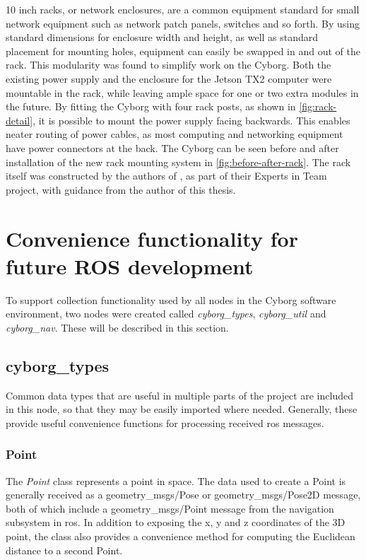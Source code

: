 \documentclass[\rootfolder/main.tex]{subfiles}
\begin{document}
10 inch racks, or network enclosures, are a common equipment standard for small network equipment such as network patch panels, switches and so forth.
By using standard dimensions for enclosure width and height, as well as standard placement for mounting holes, equipment can easily be swapped in and out of the rack.
This modularity was found to simplify work on the Cyborg. 
Both the existing power supply and the enclosure for the Jetson TX2 computer were mountable in the rack, while leaving ample space for one or two extra modules in the future.
By fitting the Cyborg with four rack posts, as shown in \cref{fig:rack-detail}, it is possible to mount the power supply facing backwards.
This enables neater routing of power cables, as most computing and networking equipment have power connectors at the back.
The Cyborg can be seen before and after installation of the new rack mounting system in \cref{fig:before-after-rack}.
The rack itself was constructed by the authors of \cite{Johansen2018}, as part of their Experts in Team project, with guidance from the author of this thesis.

\section{Convenience functionality for future ROS development}

To support collection functionality used by all nodes in the Cyborg software environment, two nodes were created called \emph{cyborg\_types}, \emph{cyborg\_util} and \emph{cyborg\_nav}.
These will be described in this section.

\subsection{cyborg\_types}

Common data types that are useful in multiple parts of the project are included in this node, so that they may be easily imported where needed.
Generally, these provide useful convenience functions for processing received \acrshort{ros} messages.

\subsubsection{Point}

The \emph{Point} class represents a point in space.
The data used to create a Point is generally received as a geometry\_msgs/Pose or geometry\_msgs/Pose2D message, both of which include a geometry\_msgs/Point message from the navigation subsystem in \acrshort{ros}.
In addition to exposing the x, y and z coordinates of the 3D point, the class also provides a convenience method for computing the Euclidean distance to a second Point.
\end{document}
